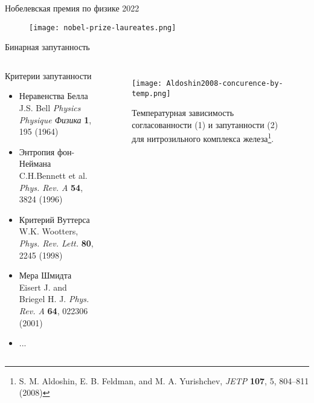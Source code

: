 \begin{frame}{Нобелевская премия по физике 2022}
\begin{figure}
    \centering
    \texttt{[image: nobel-prize-laureates.png]}
\end{figure}
\end{frame}

\begin{frame}{Бинарная запутанность}
  \begin{columns}
    \begin{block}{Критерии запутанности}
      \begin{itemize}
        \item Неравенства Белла \\
          {\footnotesize J.S. Bell \textit{Physics Physique Физика} \textbf{1}, 195 (1964)}
        \item Энтропия фон-Неймана \\
          {\footnotesize C.H.Bennett et al. \textit{Phys. Rev. A} \textbf{54}, 3824 (1996)}
        \item Критерий Вуттерса \\
          {\footnotesize W.K. Wootters, \textit{Phys. Rev. Lett.} \textbf{80}, 2245 (1998)}
        \item Мера Шмидта \\
          {\footnotesize Eisert J. and Briegel H. J. \textit{Phys. Rev. A} \textbf{64}, 022306 (2001)}
        \item ...
      \end{itemize}
    \end{block}


    \begin{figure}
      \texttt{[image: Aldoshin2008-concurence-by-temp.png]}
      \captionsetup{skip=-2mm}
      \caption{Температурная зависимость согласованности (1) и запутанности (2) для нитрозильного комплекса железа\footnote[frame]{S. M. Aldoshin, E. B. Feldman, and M. A. Yurishchev, \textit{JETP} \textbf{107}, 5, 804–811 (2008)}.}
    \end{figure}
  \end{columns}
\end{frame}
